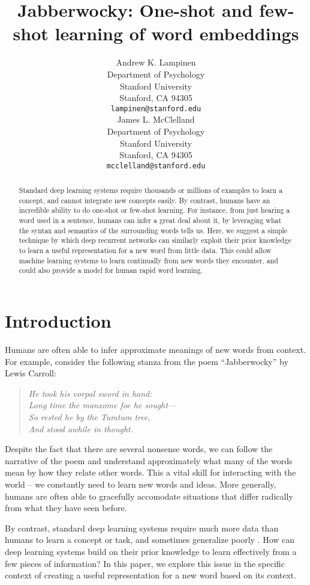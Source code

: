 \documentclass{article}
\title{Jabberwocky: One-shot and few-shot learning of word embeddings}
\author{
  Andrew K. Lampinen\\
  Department of Psychology\\
  Stanford University\\
  Stanford, CA 94305 \\
  \texttt{lampinen@stanford.edu} \\
  \And
  James L. McClelland\\
  Department of Psychology\\
  Stanford University\\
  Stanford, CA 94305 \\
  \texttt{mcclelland@stanford.edu} \\
}
\begin{document}
\maketitle

\begin{abstract}
Standard deep learning systems require thousands or millions of examples to learn a concept, and cannot integrate new concepts easily. By contrast, humans have an incredible ability to do one-shot or few-shot learning. For instance, from just hearing a word used in a sentence, humans can infer a great deal about it, by leveraging what the syntax and semantics of the surrounding words tells us. Here, we suggest a simple technique by which deep recurrent networks can similarly exploit their prior knowledge to learn a useful representation for a new word from little data. This could allow machine learning systems to learn continually from new words they encounter, and could also provide a model for human rapid word learning. 
\end{abstract}

\section{Introduction}
Humans are often able to infer approximate meanings of new words from context. For example, consider the following stanza from the poem ``Jabberwocky'' by Lewis Carroll: 
\begin{quote}
\centering
\textit{
He took his vorpal sword in hand:\\
Long time the manxome foe he sought—\\
So rested he by the Tumtum tree,\\
And stood awhile in thought.}
\end{quote}
Despite the fact that there are several nonsense words, we can follow the narrative of the poem and understand approximately what many of the words mean by how they relate other words. This a vital skill for interacting with the world -- we constantly need to learn new words and ideas. More generally, humans are often able to gracefully accomodate situations that differ radically from what they have seen before.\par 
By contrast, standard deep learning systems require much more data than humans to learn a concept or task, and sometimes generalize poorly \cite{Lake2016}. How can deep learning systems build on their prior knowledge to learn effectively from a few pieces of information? In this paper, we explore this issue in the specific context of creating a useful representation for a new word based on its context. \par
\end{document}
